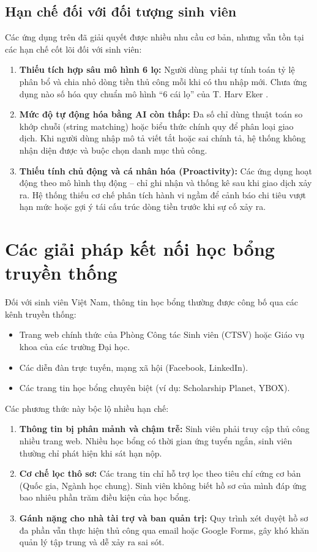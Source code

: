 \subsection{Hạn chế đối với đối tượng sinh viên}
Các ứng dụng trên đã giải quyết được nhiều nhu cầu cơ bản, nhưng vẫn tồn tại các hạn chế cốt lõi đối với sinh viên:
\begin{enumerate}
    \item \textbf{Thiếu tích hợp sâu mô hình 6 lọ:} Người dùng phải tự tính toán tỷ lệ phân bổ và chia nhỏ dòng tiền thủ công mỗi khi có thu nhập mới. Chưa ứng dụng nào số hóa quy chuẩn mô hình ``6 cái lọ'' của T. Harv Eker \cite{eker2005-6jars}.
    \item \textbf{Mức độ tự động hóa bằng AI còn thấp:} Đa số chỉ dùng thuật toán so khớp chuỗi (string matching) hoặc biểu thức chính quy để phân loại giao dịch. Khi người dùng nhập mô tả viết tắt hoặc sai chính tả, hệ thống không nhận diện được và buộc chọn danh mục thủ công.
    \item \textbf{Thiếu tính chủ động và cá nhân hóa (Proactivity):} Các ứng dụng hoạt động theo mô hình thụ động -- chỉ ghi nhận và thống kê sau khi giao dịch xảy ra. Hệ thống thiếu cơ chế phân tích hành vi ngầm để cảnh báo chi tiêu vượt hạn mức hoặc gợi ý tái cấu trúc dòng tiền trước khi sự cố xảy ra.
\end{enumerate}

\section{Các giải pháp kết nối học bổng truyền thống}
\label{sec:giai-phap-hoc-bong-hien-co}
Đối với sinh viên Việt Nam, thông tin học bổng thường được công bố qua các kênh truyền thống:
\begin{itemize}
    \item Trang web chính thức của Phòng Công tác Sinh viên (CTSV) hoặc Giáo vụ khoa của các trường Đại học.
    \item Các diễn đàn trực tuyến, mạng xã hội (Facebook, LinkedIn).
    \item Các trang tin học bổng chuyên biệt (ví dụ: Scholarship Planet, YBOX).
\end{itemize}

Các phương thức này bộc lộ nhiều hạn chế:
\begin{enumerate}
    \item \textbf{Thông tin bị phân mảnh và chậm trễ:} Sinh viên phải truy cập thủ công nhiều trang web. Nhiều học bổng có thời gian ứng tuyển ngắn, sinh viên thường chỉ phát hiện khi sát hạn nộp.
    \item \textbf{Cơ chế lọc thô sơ:} Các trang tin chỉ hỗ trợ lọc theo tiêu chí cứng cơ bản (Quốc gia, Ngành học chung). Sinh viên không biết hồ sơ của mình đáp ứng bao nhiêu phần trăm điều kiện của học bổng.
    \item \textbf{Gánh nặng cho nhà tài trợ và ban quản trị:} Quy trình xét duyệt hồ sơ đa phần vẫn thực hiện thủ công qua email hoặc Google Forms, gây khó khăn quản lý tập trung và dễ xảy ra sai sót.
\end{enumerate}

